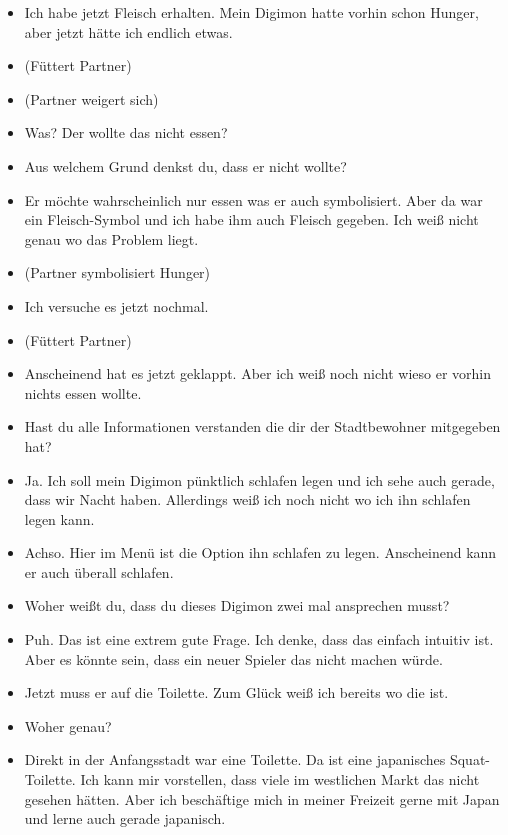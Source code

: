 {\begin{itemize}[]
    \item {} Ich habe jetzt Fleisch erhalten. Mein Digimon hatte vorhin schon Hunger, aber jetzt hätte ich endlich etwas.
    \item {} (Füttert Partner)
    \item {} (Partner weigert sich)
    \item {} Was? Der wollte das nicht essen?
    \item {} Aus welchem Grund denkst du, dass er nicht wollte?
    \item {} Er möchte wahrscheinlich nur essen was er auch symbolisiert. Aber da war ein Fleisch-Symbol und ich habe ihm auch Fleisch gegeben. Ich weiß nicht genau wo das Problem liegt.
    \item {} (Partner symbolisiert Hunger)
    \item {} Ich versuche es jetzt nochmal. 
    \item {} (Füttert Partner)
    \item {} Anscheinend hat es jetzt geklappt. Aber ich weiß noch nicht wieso er vorhin nichts essen wollte. 
    \item {} Hast du alle Informationen verstanden die dir der Stadtbewohner mitgegeben hat?
    \item {} Ja. Ich soll mein Digimon pünktlich schlafen legen und ich sehe auch gerade, dass wir Nacht haben. Allerdings weiß ich noch nicht wo ich ihn schlafen legen kann. 
    \item {} Achso. Hier im Menü ist die Option ihn schlafen zu legen. Anscheinend kann er auch überall schlafen.
    \item {} Woher weißt du, dass du dieses Digimon zwei mal ansprechen musst?
    \item {} Puh. Das ist eine extrem gute Frage. Ich denke, dass das einfach intuitiv ist. Aber es könnte sein, dass ein neuer Spieler das nicht machen würde.
    \item {} Jetzt muss er auf die Toilette. Zum Glück weiß ich bereits wo die ist.
    \item {} Woher genau?
    \item {} Direkt in der Anfangsstadt war eine Toilette. Da ist eine japanisches Squat-Toilette. Ich kann mir vorstellen, dass viele im westlichen Markt das nicht gesehen hätten. Aber ich beschäftige mich in meiner Freizeit gerne mit Japan und lerne auch gerade japanisch.

\end{itemize}}
